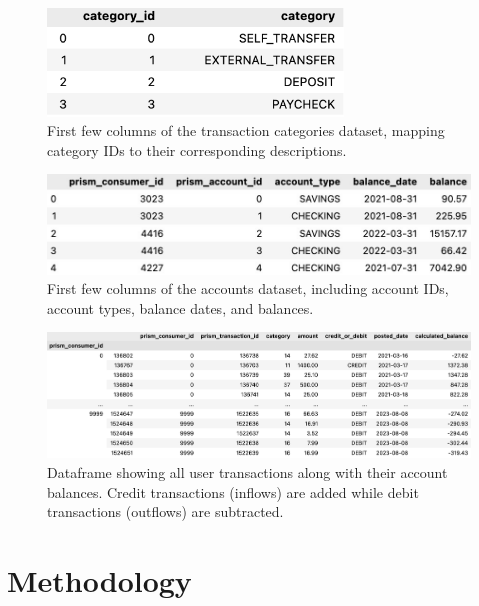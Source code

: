 \documentclass[12pt,letterpaper]{article}
\begin{document}
\begin{figure}[H]
    \centering
    \includegraphics[width=0.7\textwidth]{figure/categories_df.png}
    \caption{First few columns of the transaction categories dataset, mapping category IDs to their corresponding descriptions.}
    \label{fig:categories_df}
\end{figure}


\begin{figure}[H]
    \centering
    \includegraphics[width=\textwidth]{figure/accounts_df.jpeg}
    \caption{First few columns of the accounts dataset, including account IDs, account types, balance dates, and balances.}
    \label{fig:accounts_df}
\end{figure}

\begin{figure}[H]
    \centering
    \includegraphics[width=\textwidth]{figure/final_transaction_balance.png}
    \caption{Dataframe showing all user transactions along with their account balances. Credit transactions (inflows) are added while debit transactions (outflows) are subtracted.}
    \label{fig:final_transaction_balance}
\end{figure}


\section{Methodology}
\end{document}
